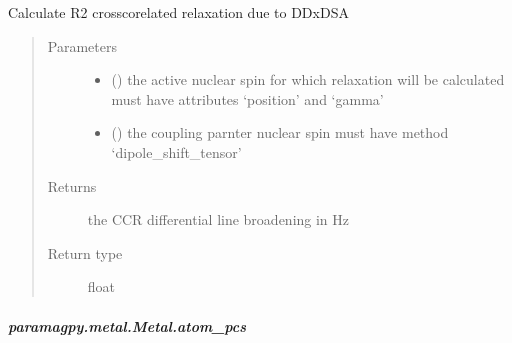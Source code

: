 \documentclass[a4paper,10pt,english,openany,oneside]{sphinxmanual}
\begin{document}
\begin{fulllineitems}
\begin{fulllineitems}
\begin{fulllineitems}
\label{\detokenize{reference/generated/paramagpy.metal.Metal.atom_ccr:paramagpy.metal.Metal.atom_ccr}}
\sphinxAtStartPar
Calculate R2 cross\sphinxhyphen{}corelated relaxation due to DDxDSA
\begin{quote}\begin{description}
\item[{Parameters}] \leavevmode\begin{itemize}
\item {} 
\sphinxAtStartPar
{} ({\hyperref[\detokenize{reference/generated/paramagpy.protein.CustomAtom:paramagpy.protein.CustomAtom}]{}}) \textendash{} the active nuclear spin for which relaxation will be calculated
must have attributes ‘position’ and ‘gamma’

\item {} 
\sphinxAtStartPar
{} ({\hyperref[\detokenize{reference/generated/paramagpy.protein.CustomAtom:paramagpy.protein.CustomAtom}]{}}) \textendash{} the coupling parnter nuclear spin
must have method ‘dipole\_shift\_tensor’

\end{itemize}

\item[{Returns}] \leavevmode
\sphinxAtStartPar
{} \textendash{} the CCR differential line broadening in Hz

\item[{Return type}] \leavevmode
\sphinxAtStartPar
float

\end{description}\end{quote}

\end{fulllineitems}



\subparagraph{paramagpy.metal.Metal.atom\_pcs}
\label{\detokenize{reference/generated/paramagpy.metal.Metal.atom_pcs:paramagpy-metal-metal-atom-pcs}}\label{\detokenize{reference/generated/paramagpy.metal.Metal.atom_pcs::doc}}


\end{fulllineitems}
\end{fulllineitems}
\end{document}
